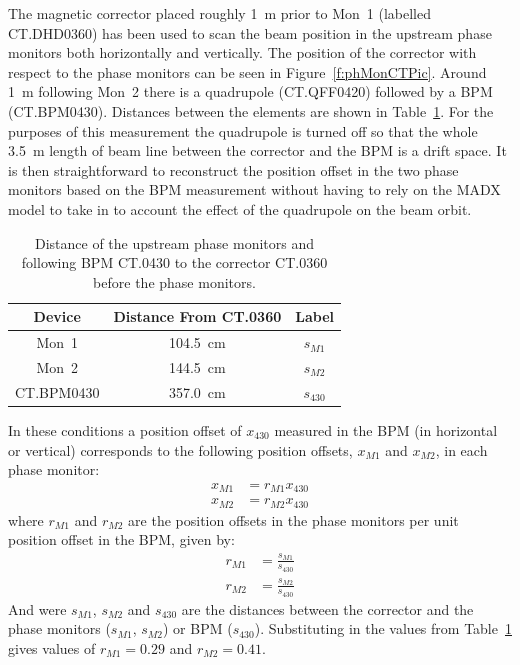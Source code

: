 The magnetic corrector placed roughly 1~m prior to Mon~1 (labelled CT.DHD0360) has been used to scan the beam position in the upstream phase monitors both horizontally and vertically. The position of the corrector with respect to the phase monitors can be seen in Figure~\ref{f:phMonCTPic}. Around 1~m following Mon~2 there is a quadrupole (CT.QFF0420) followed by a BPM (CT.BPM0430). Distances between the elements are shown in Table~\ref{t:distanceFromCT360}. For the purposes of this measurement the quadrupole is turned off so that the whole 3.5~m length of beam line between the corrector and the BPM is a drift space. It is then straightforward to reconstruct the position offset in the two phase monitors based on the BPM measurement without having to rely on the MADX model to take in to account the effect of the quadrupole on the beam orbit. 


\begin{table}
  \begin{center}
    \begin{tabular}{|c c c|}
	   \hline
       Device & Distance From CT.0360 & Label\\ \hline
       Mon~1 & 104.5~cm & \(s_{M1}\)\\ 
       Mon~2 & 144.5~cm & \(s_{M2}\)\\
       CT.BPM0430 & 357.0~cm & \(s_{430}\) \\ \hline
    \end{tabular}
    \caption{Distance of the upstream phase monitors and following BPM CT.0430 to the corrector CT.0360 before the phase monitors.}
  	\label{t:distanceFromCT360}
  \end{center}
\end{table}

In these conditions a position offset of \(x_{430}\) measured in the BPM (in horizontal or vertical) corresponds to the following position offsets, \(x_{M1}\) and \(x_{M2}\), in each phase monitor:
\begin{align}
x_{M1} &= r_{M1}x_{430} \\
x_{M2} &= r_{M2}x_{430}
\end{align}
where \(r_{M1}\) and \(r_{M2}\) are the position offsets in the phase monitors per unit position offset in the BPM, given by:
\begin{align}
r_{M1} &= \frac{s_{M1}}{s_{430}} \\
r_{M2} &= \frac{s_{M2}}{s_{430}}
\end{align}
And were \(s_{M1}\), \(s_{M2}\) and \(s_{430}\) are the distances between the corrector and the phase monitors (\(s_{M1}\), \(s_{M2}\)) or BPM (\(s_{430}\)). Substituting in the values from Table~\ref{t:distanceFromCT360} gives values of \(r_{M1} = 0.29\) and \(r_{M2} = 0.41\).

